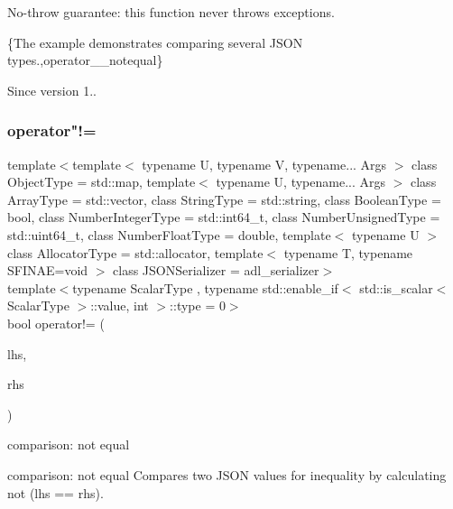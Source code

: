 No-\/throw guarantee\+: this function never throws exceptions.

\{The example demonstrates comparing several J\+S\+ON types.,operator\+\_\+\+\_\+notequal\}

\begin{DoxySince}{Since}
version 1.. 
\end{DoxySince}
\mbox{\label{classnlohmann_1_1basic__json_afefc38fc08bdb7a9a7474b5ab4a1140f}} 
\subsubsection{\texorpdfstring{operator"!=}{operator!=}\hspace{0.1cm}{\footnotesize\ttfamily [2/3]}}
{\footnotesize\ttfamily template$<$template$<$ typename U, typename V, typename... Args $>$ class Object\+Type = std\+::map, template$<$ typename U, typename... Args $>$ class Array\+Type = std\+::vector, class String\+Type  = std\+::string, class Boolean\+Type  = bool, class Number\+Integer\+Type  = std\+::int64\+\_\+t, class Number\+Unsigned\+Type  = std\+::uint64\+\_\+t, class Number\+Float\+Type  = double, template$<$ typename U $>$ class Allocator\+Type = std\+::allocator, template$<$ typename T, typename S\+F\+I\+N\+A\+E=void $>$ class J\+S\+O\+N\+Serializer = adl\+\_\+serializer$>$ \\
template$<$typename Scalar\+Type , typename std\+::enable\+\_\+if$<$ std\+::is\+\_\+scalar$<$ Scalar\+Type $>$\+::value, int $>$\+::type  = 0$>$ \\
bool operator!= (\begin{DoxyParamCaption}\item[{\mbox{\hyperlink{classnlohmann_1_1basic__json_a4057c5425f4faacfe39a8046871786ca}{const\+\_\+reference}}}]{lhs,  }\item[{const Scalar\+Type}]{rhs }\end{DoxyParamCaption})\hspace{0.3cm}{\ttfamily [friend]}}



comparison\+: not equal 

comparison\+: not equal Compares two J\+S\+ON values for inequality by calculating {\ttfamily not (lhs == rhs)}.


